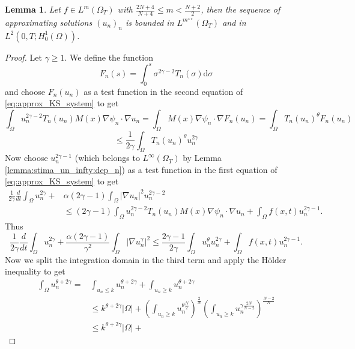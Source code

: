 \documentclass{amsart}
\numberwithin{equation}{section}
\newtheorem{lemma}[example]{Lemma}
\def\elle#1{L^{#1}}
\def\elleomT#1{L^{#1}(\Omega_T)}
\def\Hom{H^1_0(\Omega)}
\def\io{\int_\Omega}
\newcommand{\abs}[1]{\left|#1\right|}
\begin{document}
\begin{lemma}\label{lemma:stima_m**_unif}
    Let $f\in\elle m (\Omega_T)$ with $\frac{2N+4}{N+4}\leq m<\frac{N+2}{2}$, then the sequence of approximating solutions $(u_n)_n$ is bounded in $\elleomT {m^{\star\star}}$ and in $\elle2(0,T;\Hom)$.
\end{lemma}
\begin{proof}
    Let $\gamma\geq1$. We define the function
    $$F_n(s)=\int_0^s \sigma^{2\gamma-2}T_n(\sigma) \mathrm{d}\sigma$$
    and choose $F_n(u_n)$ as a test function in the second equation of \eqref{eq:approx_KS_system} to get
    $$
    \io u_n^{2\gamma-2}T_n(u_n) M(x)\nabla \psi_n\cdot\nabla u_n 
    =
    \io M(x)\nabla \psi_n\cdot\nabla F_n(u_n)
    =
    \io T_n(u_n)^\theta F_n(u_n)
    $$
    $$
    \leq\frac{1}{2\gamma}\io T_n(u_n)^\theta u_n^{2\gamma}
    $$
    Now choose $u_n^{2\gamma-1}$ (which belongs to $\elleomT\infty$ by Lemma \ref{lemma:stima_un_infty:dep_n}) as a test function in the first equation of \eqref{eq:approx_KS_system} to get
    \begin{equation*}
        \begin{split}
            \frac{1}{{2\gamma}}\frac{d}{dt}\io u_n^{2\gamma}+&\alpha(2\gamma-1)\io\abs{\nabla u_n}^2u_n^{2\gamma-2}\\&
    \leq
    (2\gamma-1)\io u_n^{2\gamma-2}T_n(u_n) M(x)\nabla \psi_n\cdot\nabla u_n+\io f(x,t)u_n^{2\gamma-1}.
        \end{split}
    \end{equation*}
    Thus
    \begin{equation}\label{basta-gamma-geq-frac12}
        \frac{1}{{2\gamma}}\frac{d}{dt}\io u_n^{2\gamma}
        +\frac{\alpha(2\gamma-1)}{\gamma^2}\io\abs{\nabla u_n^\gamma}^2
        \leq
        \frac{2\gamma-1}{2\gamma}\io u_n^\theta u_n^{2\gamma}+\io f(x,t)u_n^{2\gamma-1}.
    \end{equation}
    Now we split the integration domain in the third term and apply the H\"older inequality to get
\begin{equation}
        \begin{split}
        \io u_n^{\theta+2\gamma}=&\int_{u_n\leq k} u_n^{\theta+2\gamma}+\int_{u_n\geq k} u_n^{\theta+2\gamma}\\& \leq 
        k^{\theta+2\gamma}\abs{\Omega}+
        \left(\int_{u_n\geq k}u_n^{\theta\frac{N}{2}}\right)^{\frac{2}{N}}\left(\int_{u_n\geq k}u_n^{\gamma {\frac{2N}{N-2}}}\right)^\frac{N-2}{N}
        \\&
        \leq
        k^{\theta+2\gamma}\abs{\Omega}+

\end{split}
\end{equation}
\end{proof}
\end{document}
